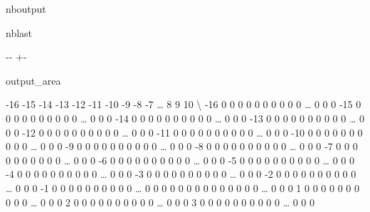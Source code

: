 \documentclass[letterpaper,10pt,english]{sphinxmanual}
\newlength\nbsphinxcodecellspacing
\begin{document}
\begin{sphinxuseclass}{nboutput}
\begin{sphinxuseclass}{nblast}
{

\kern-\sphinxverbatimsmallskipamount\kern-\baselineskip
\kern+\FrameHeightAdjust\kern-\fboxrule
\vspace{\nbsphinxcodecellspacing}

\begin{sphinxuseclass}{output_area}
\begin{sphinxuseclass}{}


\begin{sphinxVerbatim}[commandchars=\\\{\}]
\llap{\color{nbsphinxout}[48]:\,\hspace{\fboxrule}\hspace{\fboxsep}}     -16  -15  -14  -13  -12  -11  -10  -9   -8   -7   {\ldots}   8    9    10  \textbackslash{}
-16    0    0    0    0    0    0    0    0    0    0  {\ldots}    0    0    0
-15    0    0    0    0    0    0    0    0    0    0  {\ldots}    0    0    0
-14    0    0    0    0    0    0    0    0    0    0  {\ldots}    0    0    0
-13    0    0    0    0    0    0    0    0    0    0  {\ldots}    0    0    0
-12    0    0    0    0    0    0    0    0    0    0  {\ldots}    0    0    0
-11    0    0    0    0    0    0    0    0    0    0  {\ldots}    0    0    0
-10    0    0    0    0    0    0    0    0    0    0  {\ldots}    0    0    0
-9     0    0    0    0    0    0    0    0    0    0  {\ldots}    0    0    0
-8     0    0    0    0    0    0    0    0    0    0  {\ldots}    0    0    0
-7     0    0    0    0    0    0    0    0    0    0  {\ldots}    0    0    0
-6     0    0    0    0    0    0    0    0    0    0  {\ldots}    0    0    0
-5     0    0    0    0    0    0    0    0    0    0  {\ldots}    0    0    0
-4     0    0    0    0    0    0    0    0    0    0  {\ldots}    0    0    0
-3     0    0    0    0    0    0    0    0    0    0  {\ldots}    0    0    0
-2     0    0    0    0    0    0    0    0    0    0  {\ldots}    0    0    0
-1     0    0    0    0    0    0    0    0    0    0  {\ldots}    0    0    0
 0     0    0    0    0    0    0    0    0    0    0  {\ldots}    0    0    0
 1     0    0    0    0    0    0    0    0    0    0  {\ldots}    0    0    0
 2     0    0    0    0    0    0    0    0    0    0  {\ldots}    0    0    0
 3     0    0    0    0    0    0    0    0    0    0  {\ldots}    0    0    0

\end{sphinxVerbatim}
\end{sphinxuseclass}
\end{sphinxuseclass}}
\end{sphinxuseclass}
\end{sphinxuseclass}
\end{document}
